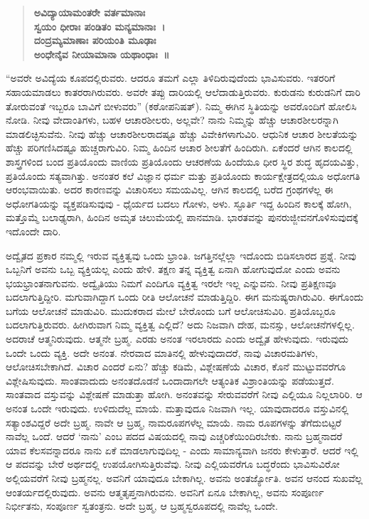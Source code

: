 \begin{verse}
\textbf{ಅವಿದ್ಯಾಯಾಮಂತರೇ ವರ್ತಮಾನಾಃ}\\\textbf{ಸ್ವಯಂ ಧೀರಾಃ ಪಂಡಿತಂ ಮನ್ಯಮಾನಾಃ~।}\\\textbf{ದಂದ್ರಮ್ಯಮಾಣಾಃ ಪರಿಯಂತಿ ಮೂಢಾಃ}\\\textbf{ಅಂಧೇನೈವ ನೀಯಾಮಾನಾ ಯಥಾಂಧಾಃ~॥}
\end{verse}

“ಅವರೇ ಅವಿದ್ಯೆಯ ಕೂಪದಲ್ಲಿರುವರು. ಆದರೂ ತಮಗೆ ಎಲ್ಲಾ ತಿಳಿದಿರುವುದೆಂದು ಭಾವಿಸುವರು. ಇತರರಿಗೆ ಸಹಾಯಮಾಡಲು ಕಾತರರಾಗಿರುವರು. ಅವರೇ ತಪ್ಪು ದಾರಿಯಲ್ಲಿ ಆಲೆದಾಡುತ್ತಿರುವರು. ಕುರುಡನು ಕುರುಡನಿಗೆ ದಾರಿ ತೋರುವಂತೆ ಇಬ್ಬರೂ ಬಾವಿಗೆ ಬೀಳುವರು” (ಕಠೋಪನಿಷತ್​). ನಿಮ್ಮ ಈಗಿನ ಸ್ಥಿತಿಯನ್ನು ಅವರೊಂದಿಗೆ ಹೋಲಿಸಿ ನೋಡಿ. ನೀವು ವೇದಾಂತಿಗಳು, ಬಹಳ ಆಚಾರಶೀಲರು, ಅಲ್ಲವೇ? ನಾನು ನಿಮ್ಮನ್ನು ಹೆಚ್ಚು ಆಚಾರಶೀಲರನ್ನಾಗಿ ಮಾಡಲಿಚ್ಛಿಸುವೆನು. ನೀವು ಹೆಚ್ಚು ಆಚಾರಶೀಲರಾದಷ್ಟೂ ಹೆಚ್ಚು ವಿವೇಕಿಗಳಾಗುವಿರಿ. ಆಧುನಿಕ ಆಚಾರ ಶೀಲತೆಯನ್ನು ಹೆಚ್ಚು ಪರಿಗಣಿಸಿದಷ್ಟೂ ಹುಚ್ಚರಾಗುವಿರಿ. ನಿಮ್ಮ ಹಿಂದಿನ ಆಚಾರ ಶೀಲತೆಗೆ ಹಿಂದಿರುಗಿ. ಏಕೆಂದರೆ ಆಗಿನ ಕಾಲದಲ್ಲಿ ಶಾಸ್ತ್ರಗಳಿಂದ ಬಂದ ಪ್ರತಿಯೊಂದು ವಾಣಿಯ ಪ್ರತಿಯೊಂದು ಆಚರಣೆಯ ಹಿಂದೆಯೂ ಧೀರ ಸ್ಥಿರ ಶುದ್ಧ ಹೃದಯವಿತ್ತು, ಪ್ರತಿಯೊಂದು ಸತ್ಯವಾಗಿತ್ತು. ಅನಂತರ ಕಲೆ ವಿಜ್ಞಾನ ಧರ್ಮ ಮತ್ತು ಪ್ರತಿಯೊಂದು ಕಾರ್ಯಕ್ಷೇತ್ರದಲ್ಲಿಯೂ ಅಧೋಗತಿ ಆರಂಭವಾಯಿತು. ಅದರ ಕಾರಣವನ್ನು ವಿಚಾರಿಸಲು ಸಮಯವಿಲ್ಲ. ಆಗಿನ ಕಾಲದಲ್ಲಿ ಬರೆದ ಗ್ರಂಥಗಳೆಲ್ಲ ಈ ಅಧೋಗತಿಯನ್ನು ವ್ಯಕ್ತಪಡಿಸುವುವು - ಧೈರ್ಯದ ಬದಲು ಗೋಳು, ಅಳು. ಸ್ಫೂರ್ತಿ ಇದ್ದ ಹಿಂದಿನ ಕಾಲಕ್ಕೆ ಹೋಗಿ, ಮತ್ತೊಮ್ಮೆ ಬಲಾಢ್ಯರಾಗಿ, ಹಿಂದಿನ ಅಮೃತ ಚಿಲುಮೆಯಲ್ಲಿ ಪಾನಮಾಡಿ. ಭಾರತವನ್ನು ಪುನರುಜ್ಜೀವನಗೊಳಿಸುವುದಕ್ಕೆ ಇದೊಂದೇ ದಾರಿ.

ಅದ್ವೈತದ ಪ್ರಕಾರ ನಮ್ಮಲ್ಲಿ ಇರುವ ವ್ಯಕ್ತಿತ್ವವು ಒಂದು ಭ್ರಾಂತಿ. ಜಗತ್ತಿನಲ್ಲೆಲ್ಲಾ ಇದೊಂದು ಬಿಡಿಸಲಾರದ ಪ್ರಶ್ನೆ. ನೀವು ಒಬ್ಬನಿಗೆ ಅವನು ಒಬ್ಬ ವ್ಯಕ್ತಿಯಲ್ಲ ಎಂದು ಹೇಳಿ. ತಕ್ಷಣ ತನ್ನ ವ್ಯಕ್ತಿತ್ವ ಏನಾಗಿ ಹೋಗುವುದೋ ಎಂದು ಅವನು ಭಯಭ್ರಾಂತನಾಗುವನು. ಅದ್ವೈತಿಯು ನಿಮಗೆ ಎಂದಿಗೂ ವ್ಯಕ್ತಿತ್ವ ಇರಲೇ ಇಲ್ಲ ಎನ್ನುವನು. ನೀವು ಪ್ರತಿಕ್ಷಣವೂ ಬದಲಾಗುತ್ತಿದ್ದೀರಿ. ಮಗುವಾಗಿದ್ದಾಗ ಒಂದು ರೀತಿ ಆಲೋಚನೆ ಮಾಡುತ್ತಿದ್ದಿರಿ. ಈಗ ಮನುಷ್ಯರಾಗಿರುವಿರಿ. ಈಗೊಂದು ಬಗೆಯ ಆಲೋಚನೆ ಮಾಡುವಿರಿ. ಮುದುಕರಾದ ಮೇಲೆ ಬೇರೊಂದು ಬಗೆ ಆಲೋಚಿಸುವಿರಿ. ಪ್ರತಿಯೊಬ್ಬರೂ ಬದಲಾಗುತ್ತಿರುವರು. ಹೀಗಿರುವಾಗ ನಿಮ್ಮ ವ್ಯಕ್ತಿತ್ವ ಎಲ್ಲಿದೆ? ಅದು ನಿಜವಾಗಿ ದೇಹ, ಮನಸ್ಸು, ಆಲೋಚನೆಗಳಲ್ಲಿಲ್ಲ. ಅದರಾಚೆ ಆತ್ಮನಿರುವುದು. ಆತ್ಮನೇ ಬ್ರಹ್ಮ. ಎರಡು ಅನಂತ ಇರಲಾರದು ಎಂದು ಅದ್ವೈತ ಹೇಳುವುದು. ಇರುವುದು ಒಂದೇ ಒಂದು ವ್ಯಕ್ತಿ. ಅದೇ ಅನಂತ. ನೇರವಾದ ಮಾತಿನಲ್ಲಿ ಹೇಳುವುದಾದರೆ, ನಾವು ವಿಚಾರಮತಿಗಳು, ಆಲೋಚಿಸಬೇಕಾಗಿದೆ. ವಿಚಾರ ಎಂದರೆ ಏನು? ಹೆಚ್ಚು ಕಡಿಮೆ, ವಿಶ್ಲೇಷಣೆಯೆ ವಿಚಾರ, ಕೊನೆ ಮುಟ್ಟುವವರೆಗೂ ವಿಶ್ಲೇಷಿಸುವುದು. ಸಾಂತವಾದುದು ಅನಂತದೊಡನೆ ಒಂದಾದಾಗಲೇ ಆತ್ಯಂತಿಕ ವಿಶ್ರಾಂತಿಯನ್ನು ಪಡೆಯುತ್ತದೆ. ಸಾಂತವಾದ ವಸ್ತುವನ್ನು ವಿಶ್ಲೇಷಣೆ ಮಾಡುತ್ತಾ ಹೋಗಿ. ಅನಂತವನ್ನು ಸೇರುವವರೆಗೆ ನೀವು ಎಲ್ಲಿಯೂ ನಿಲ್ಲಲಾರಿರಿ. ಆ ಅನಂತ ಒಂದೇ ಇರುವುದು. ಉಳಿದುದೆಲ್ಲ ಮಾಯೆ. ಮತ್ತಾವುದೂ ನಿಜವಾಗಿ ಇಲ್ಲ. ಯಾವುದಾದರೂ ವಸ್ತುವಿನಲ್ಲಿ ಸತ್ಯಾಂಶವಿದ್ದರೆ ಅದೇ ಬ್ರಹ್ಮ. ನಾವೇ ಆ ಬ್ರಹ್ಮ, ನಾಮರೂಪಗಳೆಲ್ಲ ಮಾಯೆ. ನಾಮ ರೂಪಗಳನ್ನು ತೆಗೆದುಬಿಟ್ಟರೆ ನಾವೆಲ್ಲ ಒಂದೆ. ಆದರೆ ‘ನಾನು’ ಎಂಬ ಪದದ ವಿಷಯದಲ್ಲಿ ನಾವು ಎಚ್ಚರಿಕೆಯಿಂದಿರಬೇಕು. ನಾನು ಬ್ರಹ್ಮನಾದರೆ ಯಾವ ಕೆಲಸವನ್ನಾದರೂ ನಾನು ಏಕೆ ಮಾಡಲಾಗುವುದಿಲ್ಲ - ಎಂದು ಸಾಮಾನ್ಯವಾಗಿ ಜನರು ಕೇಳುತ್ತಾರೆ. ಆದರೆ ಇಲ್ಲಿ ಆ ಪದವನ್ನು ಬೇರೆ ಅರ್ಥದಲ್ಲಿ ಉಪಯೋಗಿಸುತ್ತಿರುವೆವು. ನೀವು ಎಲ್ಲಿಯವರೆಗೂ ಬದ್ಧರೆಂದು ಭಾವಿಸುವಿರೋ ಅಲ್ಲಿಯವರೆಗೆ ನೀವು ಬ್ರಹ್ಮನಲ್ಲ. ಅವನಿಗೆ ಯಾವುದೂ ಬೇಕಾಗಿಲ್ಲ. ಅವನು ಅಂತರ್ಜ್ಯೋತಿ. ಅವನ ಆನಂದ ಸುಖವೆಲ್ಲ ಆಂತರ್ಯದಲ್ಲಿರುವುದು. ಅವನು ಆತ್ಮತೃಪ್ತನಾಗಿರುವನು. ಅವನಿಗೆ ಏನೂ ಬೇಕಾಗಿಲ್ಲ, ಅವನು ಸಂಪೂರ್ಣ ನಿರ್ಭೀತನು, ಸಂಪೂರ್ಣ ಸ್ವತಂತ್ರನು. ಅದೇ ಬ್ರಹ್ಮ, ಆ ಬ್ರಹ್ಮಸ್ವರೂಪದಲ್ಲಿ ನಾವೆಲ್ಲ ಒಂದೇ.

